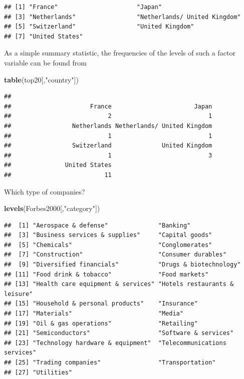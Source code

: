 \documentclass[]{book}
\newenvironment{Shaded}{\begin{snugshade}}{\end{snugshade}}
\newcommand{\KeywordTok}[1]{\textcolor[rgb]{0.13,0.29,0.53}{\textbf{#1}}}
\newcommand{\StringTok}[1]{\textcolor[rgb]{0.31,0.60,0.02}{#1}}
\newcommand{\NormalTok}[1]{#1}
\begin{document}
\begin{verbatim}
## [1] "France"                      "Japan"                      
## [3] "Netherlands"                 "Netherlands/ United Kingdom"
## [5] "Switzerland"                 "United Kingdom"             
## [7] "United States"
\end{verbatim}

As a simple summary statistic, the frequencies of the levels of such a
factor variable can be found from

\begin{Shaded}
\begin{Highlighting}[]
\KeywordTok{table}\NormalTok{(top20[,}\StringTok{"country"}\NormalTok{])}
\end{Highlighting}
\end{Shaded}

\begin{verbatim}
## 
##                      France                       Japan 
##                           2                           1 
##                 Netherlands Netherlands/ United Kingdom 
##                           1                           1 
##                 Switzerland              United Kingdom 
##                           1                           3 
##               United States 
##                          11
\end{verbatim}

Which type of companies?

\begin{Shaded}
\begin{Highlighting}[]
\KeywordTok{levels}\NormalTok{(Forbes2000[,}\StringTok{"category"}\NormalTok{])}
\end{Highlighting}
\end{Shaded}

\begin{verbatim}
##  [1] "Aerospace & defense"              "Banking"                         
##  [3] "Business services & supplies"     "Capital goods"                   
##  [5] "Chemicals"                        "Conglomerates"                   
##  [7] "Construction"                     "Consumer durables"               
##  [9] "Diversified financials"           "Drugs & biotechnology"           
## [11] "Food drink & tobacco"             "Food markets"                    
## [13] "Health care equipment & services" "Hotels restaurants & leisure"    
## [15] "Household & personal products"    "Insurance"                       
## [17] "Materials"                        "Media"                           
## [19] "Oil & gas operations"             "Retailing"                       
## [21] "Semiconductors"                   "Software & services"             
## [23] "Technology hardware & equipment"  "Telecommunications services"     
## [25] "Trading companies"                "Transportation"                  
## [27] "Utilities"
\end{verbatim}
\end{document}
